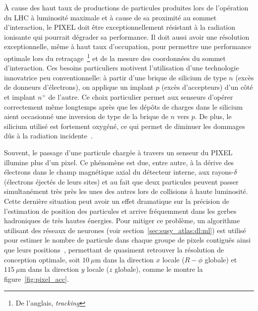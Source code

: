 À cause des haut taux de productions de particules produites lors de
l'opération du LHC à luminosité maximale et à cause de sa proximité au
sommet d'interaction, le PIXEL doit être exceptionnellement résistant
à la radiation ionisante qui pourrait dégrader sa performance. Il doit
aussi avoir une résolution exceptionnelle, même à haut taux
d'occupation, pour permettre une performance optimale lors du
retraçage~\footnote{De l'anglais, \emph{tracking}} et de la mesure des
coordonnées du sommet d'interaction. Ces besoins particuliers motivent
l'utilisation d'une technologie innovatrice peu conventionnelle: à
partir d'une brique de silicium de type $n$ (excès de donneurs
d'électrons), on applique un implant $p$ (excès d'accepteurs) d'un
côté et implant $n^+$ de l'autre. Ce choix particulier permet aux
senseurs d'opérer correctement même longtemps après que les dépôts de
charges dans le silicium aient occasionné une inversion de type de la
brique de $n$ vers $p$. De plus, le silicium utilisé est fortement
oxygéné, ce qui permet de diminuer les dommages dûs à la radiation
incidente~\cite{collaboration_atlas_2008}.

Souvent, le passage d'une particule chargée à travers un senseur du
PIXEL illumine plus d'un pixel. Ce phénomène est due, entre autre, à
la dérive des électrons dans le champ magnétique axial du détecteur
interne, aux rayons-$\delta$ (électrons éjectés de leurs sites) et au
fait que deux particules peuvent passer simultanément très près les
unes des autres lors de collisions à haute luminosité. Cette dernière
situation peut avoir un effet dramatique sur la précision de
l'estimation de position des particules et arrive fréquemment dans les
gerbes hadroniques de très hautes énergies. Pour mitiger ce problème,
un algorithme utilisant des réseaux de neurones (voir
section~\ref{sec:susy_atlas:dl:ml}) est utilisé pour estimer le nombre
de particule dans chaque groupe de pixels contiguës ainsi que leurs
positions~\cite{collaboration_neural_2014}, permettant de quasiment
retrouver la résolution de conception optimale, soit $10~\mu$m dans la
direction $x$ locale ($R-\phi$ globale) et $115~\mu$m dans la
direction $y$ locale ($z$ globale), comme le montre la
figure~\ref{fig:pixel_acc}.

